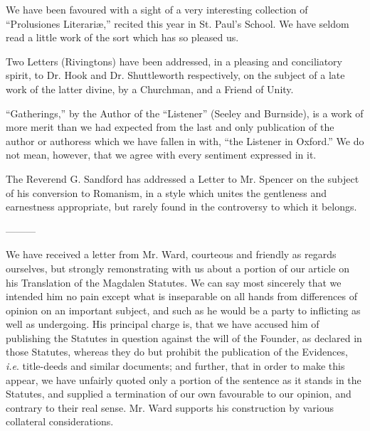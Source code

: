 We have been favoured with a sight of a very
interesting collection of ``Prolusiones Literariæ,'' recited this year in
St. Paul's School. We have seldom read a little work of the sort which
has so pleased us.

Two Letters (Rivingtons) have been addressed, in a
pleasing and conciliatory spirit, to Dr. Hook and Dr. Shuttleworth
respectively, on the subject of a late work of the latter divine, by a
Churchman, and a Friend of Unity.

``Gatherings,'' by the Author of the ``Listener''
(Seeley and Burnside), is a work of more merit than we had expected from
the last and only publication of the author or authoress which we have
fallen in with, ``the Listener in Oxford.'' We do not mean, however, that
we agree with every sentiment expressed in it.

The Reverend G. Sandford has addressed a Letter to
Mr. Spencer on the subject of his conversion to Romanism, in a style
which unites the gentleness and earnestness appropriate, but rarely
found in the controversy to which it belongs.

———

We have received a letter from Mr. Ward, courteous
and friendly as regards ourselves, but strongly remonstrating with us
about a portion of our article on his Translation of the Magdalen
Statutes. We can say most sincerely that we intended him no pain except
what is inseparable on all hands from differences of opinion on an
important subject, and such as he would be a party to inflicting as well
as undergoing. His principal charge is, that we have accused him of
publishing the Statutes in question against the will of the Founder, as
declared in those Statutes, whereas they do but prohibit the publication
of the Evidences, \emph{i.e}. title-deeds and similar documents;
and further, that in order to make this appear, we have unfairly quoted
only a portion of the sentence as it stands in the Statutes, and
supplied a termination of our own favourable to our opinion, and
contrary to their real sense. Mr. Ward supports his construction by
various collateral considerations.

